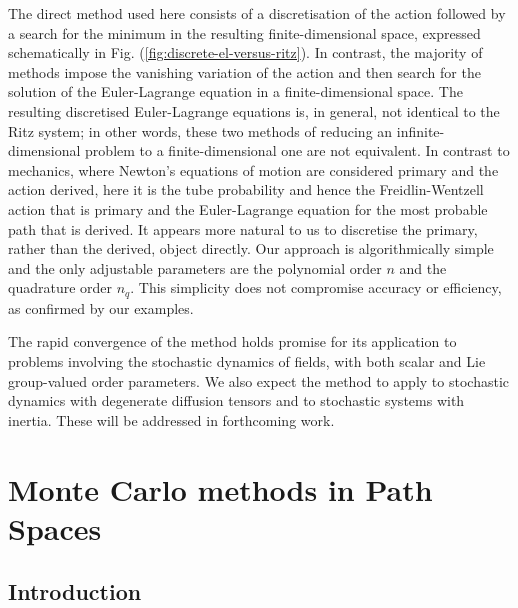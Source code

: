 The direct method used here consists of a discretisation of the action
followed by a search for the minimum in the resulting finite-dimensional
space, expressed schematically in Fig. (\ref{fig:discrete-el-versus-ritz}).
In contrast, the majority of methods impose the vanishing variation
of the action and then search for the solution of the Euler-Lagrange
equation in a finite-dimensional space. The resulting discretised
Euler-Lagrange equations is, in general, not identical to the Ritz
system; in other words, these two methods of reducing an infinite-dimensional
problem to a finite-dimensional one are not equivalent. In contrast
to mechanics, where Newton's equations of motion are considered primary
and the action derived, here it is the tube probability and hence
the Freidlin-Wentzell action that is primary and the Euler-Lagrange
equation for the most probable path that is derived. It appears more
natural to us to discretise the primary, rather than the derived,
object directly. Our approach is algorithmically simple and the only
adjustable parameters are the polynomial order $n$ and the quadrature
order $n_{q}.$ This simplicity does not compromise accuracy or efficiency,
as confirmed by our examples. 

The rapid convergence of the method holds promise for its application
to problems involving the stochastic dynamics of fields, with both
scalar and Lie group-valued order parameters. We also expect the method
to apply to stochastic dynamics with degenerate diffusion tensors
and to stochastic systems with inertia. These will be addressed in
forthcoming work.

\chapter{Monte Carlo methods in Path Spaces} \label{ch:Monte Carlo methods in Path Spaces}

\section{Introduction}

